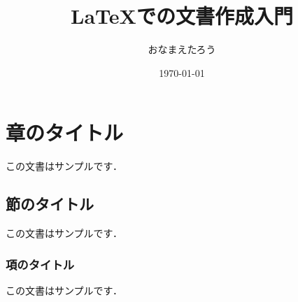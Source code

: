 \documentclass{jarticle}
\title{LaTeXでの文書作成入門}
\author{おなまえたろう}
\date{\today}
\begin{document}

\maketitle

\section{章のタイトル}
この文書はサンプルです．

\subsection{節のタイトル}
この文書はサンプルです．

\subsubsection{項のタイトル}
この文書はサンプルです．


\end{document}
